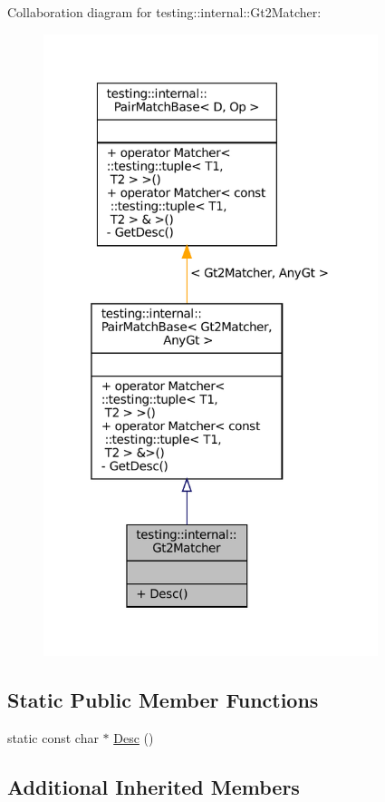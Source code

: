 Collaboration diagram for testing\+:\+:internal\+:\+:Gt2\+Matcher\+:
\nopagebreak
\begin{figure}[H]
\begin{center}
\leavevmode
\includegraphics[width=277pt]{classtesting_1_1internal_1_1Gt2Matcher__coll__graph}
\end{center}
\end{figure}
\subsection*{Static Public Member Functions}
\begin{DoxyCompactItemize}
\item 
static const char $\ast$ \hyperlink{classtesting_1_1internal_1_1Gt2Matcher_a195be80a6c19ff32fc7b6c1e26aa60da}{Desc} ()
\end{DoxyCompactItemize}
\subsection*{Additional Inherited Members}


